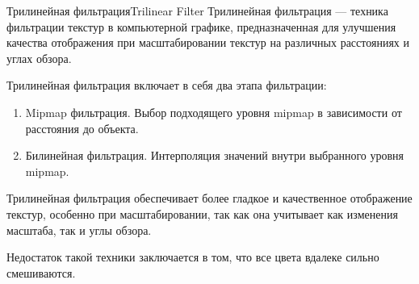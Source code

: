 \documentclass{beamer}
\begin{document}
	\begin{frame}{Трилинейная фильтрация}{Trilinear Filter}
		Трилинейная фильтрация --- техника фильтрации текстур в компьютерной графике, предназначенная для улучшения качества отображения при масштабировании текстур на различных расстояниях и углах обзора.

		Трилинейная фильтрация включает в себя два этапа фильтрации:
		\begin{enumerate}
			\item 
			Mipmap фильтрация. Выбор подходящего уровня mipmap в зависимости от расстояния до объекта.
			\item
			Билинейная фильтрация. Интерполяция значений внутри выбранного уровня mipmap.
		\end{enumerate}


		Трилинейная фильтрация обеспечивает более гладкое и качественное отображение текстур, особенно при масштабировании, так как она учитывает как изменения масштаба, так и углы обзора.

		Недостаток такой техники заключается в том, что все цвета вдалеке сильно смешиваются.


	\end{frame}


	
	
\end{document}
